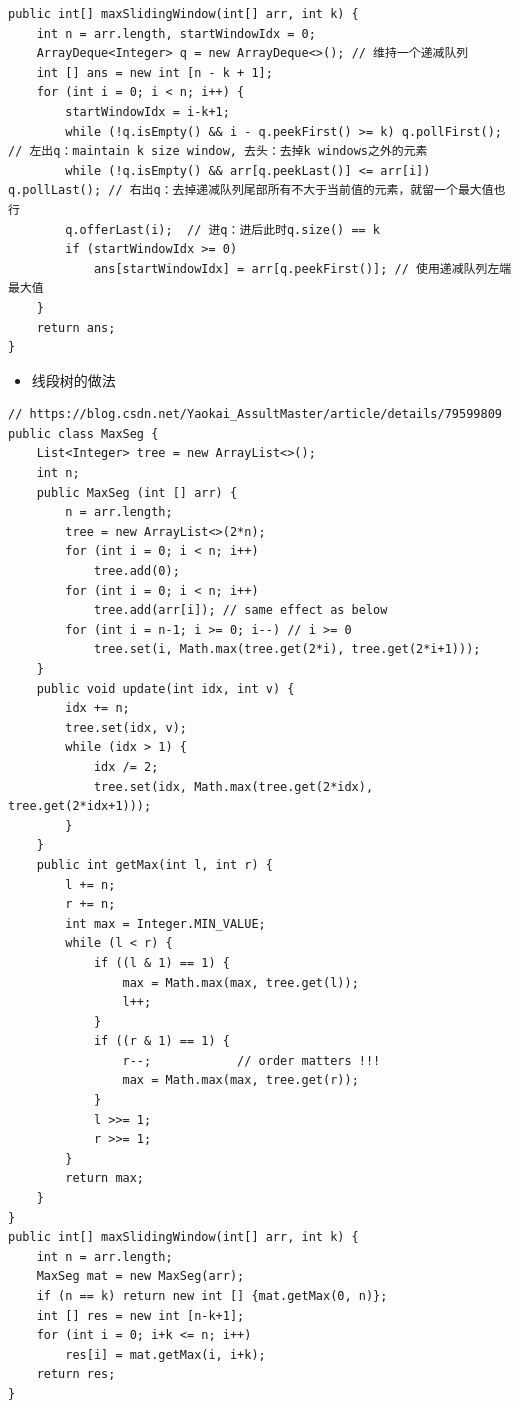 \documentclass[9pt, b5paaper]{book}
\begin{document}
\begin{verbatim}
public int[] maxSlidingWindow(int[] arr, int k) {
    int n = arr.length, startWindowIdx = 0;
    ArrayDeque<Integer> q = new ArrayDeque<>(); // 维持一个递减队列
    int [] ans = new int [n - k + 1];
    for (int i = 0; i < n; i++) {
        startWindowIdx = i-k+1;
        while (!q.isEmpty() && i - q.peekFirst() >= k) q.pollFirst();     // 左出q：maintain k size window, 去头：去掉k windows之外的元素
        while (!q.isEmpty() && arr[q.peekLast()] <= arr[i]) q.pollLast(); // 右出q：去掉递减队列尾部所有不大于当前值的元素，就留一个最大值也行
        q.offerLast(i);  // 进q：进后此时q.size() == k 
        if (startWindowIdx >= 0)
            ans[startWindowIdx] = arr[q.peekFirst()]; // 使用递减队列左端最大值
    }
    return ans;
}
\end{verbatim}
\begin{itemize}
\item 线段树的做法
\end{itemize}
\begin{verbatim}
// https://blog.csdn.net/Yaokai_AssultMaster/article/details/79599809
public class MaxSeg {
    List<Integer> tree = new ArrayList<>();
    int n;
    public MaxSeg (int [] arr) {
        n = arr.length;
        tree = new ArrayList<>(2*n);
        for (int i = 0; i < n; i++) 
            tree.add(0);
        for (int i = 0; i < n; i++) 
            tree.add(arr[i]); // same effect as below
        for (int i = n-1; i >= 0; i--) // i >= 0
            tree.set(i, Math.max(tree.get(2*i), tree.get(2*i+1)));
    }
    public void update(int idx, int v) {
        idx += n;
        tree.set(idx, v);
        while (idx > 1) {
            idx /= 2;
            tree.set(idx, Math.max(tree.get(2*idx), tree.get(2*idx+1)));
        }
    }
    public int getMax(int l, int r) {
        l += n;
        r += n;
        int max = Integer.MIN_VALUE;
        while (l < r) {
            if ((l & 1) == 1) {
                max = Math.max(max, tree.get(l));
                l++;
            }
            if ((r & 1) == 1) {
                r--;            // order matters !!!
                max = Math.max(max, tree.get(r));
            }
            l >>= 1;
            r >>= 1;
        }
        return max;
    }
}
public int[] maxSlidingWindow(int[] arr, int k) {
    int n = arr.length;
    MaxSeg mat = new MaxSeg(arr);
    if (n == k) return new int [] {mat.getMax(0, n)};
    int [] res = new int [n-k+1];
    for (int i = 0; i+k <= n; i++) 
        res[i] = mat.getMax(i, i+k);
    return res;
}
\end{verbatim}
\end{document}
